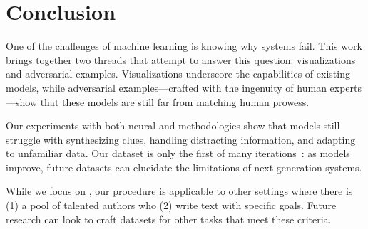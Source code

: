 \section{Conclusion}
\label{sec:future}

One of the challenges of machine learning is knowing
why systems fail.  This work brings together two threads that
attempt to answer this question: visualizations and adversarial
examples.  Visualizations underscore the capabilities of existing models,
while adversarial examples---crafted with the ingenuity of human
experts---show that these models are still
far from matching human prowess. 

Our experiments with both neural and  methodologies show that  models
still struggle with synthesizing clues, handling distracting information,
and adapting to unfamiliar data.  Our \challenge{} dataset is only the first of
many iterations~\cite{ruef16build}: as models improve, future \challenge{}
datasets can elucidate the limitations of next-generation  systems.

While we focus on , our procedure is applicable to
other  settings where there is (1) a pool of talented authors
who (2) write text with specific goals. Future research
can look to craft \challenge{} datasets for other  tasks
that meet these criteria.